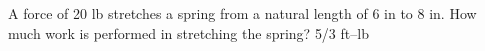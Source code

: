 {A force of 20 lb stretches a spring from a natural length of 6 in to 8 in. How much work is performed in stretching the spring?}
{5/3 ft--lb}
